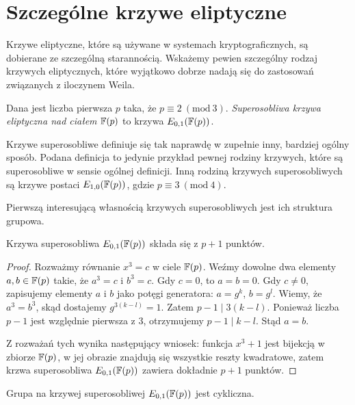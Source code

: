\section{Szczególne krzywe eliptyczne}

\noindent
Krzywe eliptyczne, które są używane w systemach kryptograficznych,
są dobierane ze szczególną starannością.
Wskażemy pewien szczególny rodzaj krzywych eliptycznych,
które wyjątkowo dobrze nadają się do zastosowań
związanych z iloczynem Weila.

\begin{definition}
Dana jest liczba pierwsza $p$ taka, że $p \equiv 2\ (\mathrm{mod}\ 3)$.
\emph{Superosobliwa krzywa eliptyczna nad ciałem $\mathbb{F}(p)$}
to krzywa $E_{0,1}(\mathbb{F}(p))$.
\end{definition}

\begin{remark}
Krzywe superosobliwe definiuje się tak naprawdę w zupełnie inny,
bardziej ogólny sposób. Podana definicja to jedynie przykład
pewnej rodziny krzywych, które są superosobliwe w sensie ogólnej definicji.
Inną rodziną krzywych superosobliwych są krzywe postaci $E_{1,0}(\mathbb{F}(p))$,
gdzie $p \equiv 3\ (\mathrm{mod}\ 4)$.
\end{remark}

\noindent
Pierwszą interesującą własnością krzywych superosobliwych
jest ich struktura grupowa.

\begin{theorem}
Krzywa superosobliwa $E_{0,1}(\mathbb{F}(p))$ składa się z $p + 1$ punktów.
\end{theorem}

\begin{proof}
Rozważmy równanie $x^3 = c$ w ciele $\mathbb{F}(p)$.
Weźmy dowolne dwa elementy $a, b \in \mathbb{F}(p)$ takie, że $a^3 = c$ i $b^3 = c$.
Gdy $c = 0$, to $a = b = 0$.
Gdy $c \neq 0$, zapisujemy elementy $a$ i $b$ jako potęgi generatora:
$a = g^k$, $b = g^l$.
Wiemy, że $a^3 = b^3$, skąd dostajemy $g^{3(k-l)} = 1$.
Zatem $p-1 \mid 3(k-l)$.
Ponieważ liczba $p-1$ jest względnie pierwsza z $3$,
otrzymujemy $p-1 \mid k-l$.
Stąd $a = b$.

\noindent
Z rozważań tych wynika następujący wniosek:
funkcja $x^3 + 1$ jest bijekcją w zbiorze $\mathbb{F}(p)$,
w jej obrazie znajdują się wszystkie reszty kwadratowe,
zatem krzwa superosobliwa $E_{0,1}(\mathbb{F}(p))$ zawiera dokładnie $p+1$ punktów.
\end{proof}

\begin{theorem}
Grupa na krzywej superosobliwej $E_{0,1}(\mathbb{F}(p))$
jest cykliczna.
\end{theorem}

